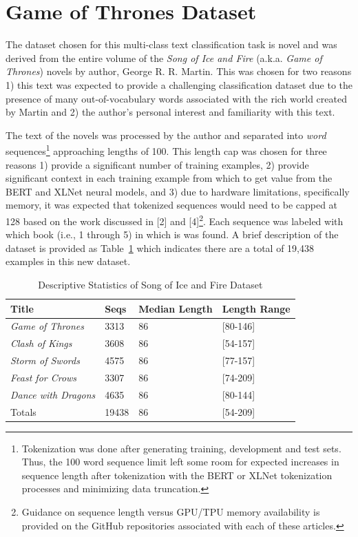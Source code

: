 \documentclass[twoside,twocolumn,10pt]{article}
\begin{document}
\section{Game of Thrones Dataset} \label{data}
The dataset chosen for this multi-class text classification task is novel and was derived from the entire volume of the {\it Song of Ice and Fire} (a.k.a. {\it Game of Thrones}) novels by author, George R. R. Martin. This was chosen for two reasons 1) this text was expected to provide a challenging classification dataset due to the presence of many out-of-vocabulary words associated with the rich world created by Martin and 2) the author's personal interest and familiarity with this text.

The text of the novels was processed by the author and separated into {\it word} sequences\footnote{Tokenization was done after generating training, development and test sets. Thus, the 100 word sequence limit left some room for expected increases in sequence length after tokenization with the BERT or XLNet tokenization processes and minimizing data truncation.} approaching lengths of 100. This length cap was chosen for three reasons 1) provide a significant number of training examples, 2) provide significant context in each training example from which to get value from the BERT and XLNet neural models, and 3) due to hardware limitations, specifically memory, it was expected that tokenized sequences would need to be capped at 128 based on the work discussed in [2] and [4]\footnote{Guidance on sequence length versus GPU/TPU memory availability is provided on the GitHub repositories associated with each of these articles.}. Each sequence was labeled with which book (i.e., 1 through 5) in which is was found. A brief description of the dataset is provided as Table~\ref{tab:data} which indicates there are a total of 19,438 examples in this new dataset.

\begin{table}[!htb]
	\caption{Descriptive Statistics of Song of Ice and Fire Dataset}\label{tab:data}
	\centering
	\begin{tabular}{p{3.0cm} p{1cm} p{1.5cm} p{3.0cm}}
		\toprule
		Title & Seqs & Median Length & Length Range \\
		\midrule
		{\it Game of Thrones} & 3313 & 86 & [80-146]  \\
		{\it Clash of Kings} & 3608 & 86 & [54-157] \\
		{\it Storm of Swords} & 4575 & 86 & [77-157]  \\
		{\it Feast for Crows} & 3307 & 86 & [74-209]  \\
		{\it Dance with Dragons} & 4635 & 86 & [80-144]  \\
		\midrule
		Totals & 19438 & 86 & [54-209]  \\
		\bottomrule
	\end{tabular}
\end{table}
\end{document}
